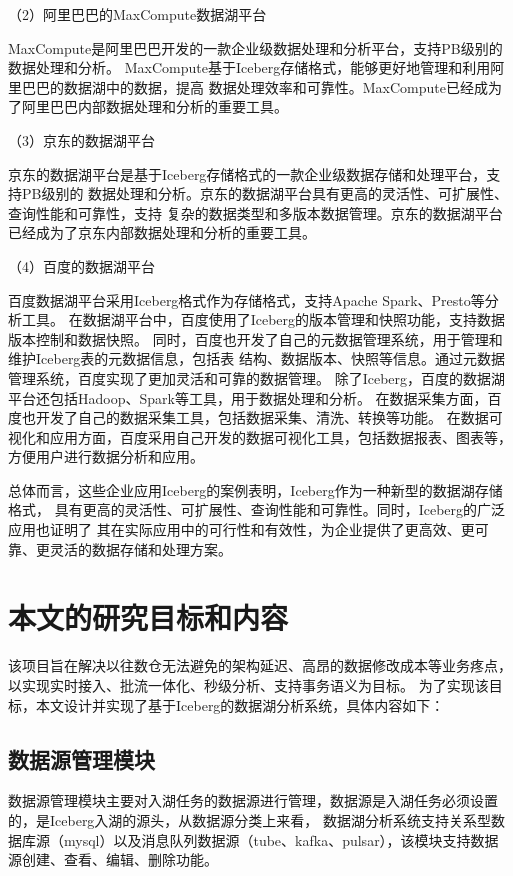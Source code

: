 （2）阿里巴巴的MaxCompute数据湖平台

MaxCompute是阿里巴巴开发的一款企业级数据处理和分析平台，支持PB级别的数据处理和分析。
MaxCompute基于Iceberg存储格式，能够更好地管理和利用阿里巴巴的数据湖中的数据，提高
数据处理效率和可靠性。MaxCompute已经成为了阿里巴巴内部数据处理和分析的重要工具。

（3）京东的数据湖平台

京东的数据湖平台是基于Iceberg存储格式的一款企业级数据存储和处理平台，支持PB级别的
数据处理和分析。京东的数据湖平台具有更高的灵活性、可扩展性、查询性能和可靠性，支持
复杂的数据类型和多版本数据管理。京东的数据湖平台已经成为了京东内部数据处理和分析的重要工具。

（4）百度的数据湖平台

百度数据湖平台采用Iceberg格式作为存储格式，支持Apache Spark、Presto等分析工具。
在数据湖平台中，百度使用了Iceberg的版本管理和快照功能，支持数据版本控制和数据快照。
同时，百度也开发了自己的元数据管理系统，用于管理和维护Iceberg表的元数据信息，包括表
结构、数据版本、快照等信息。通过元数据管理系统，百度实现了更加灵活和可靠的数据管理。
除了Iceberg，百度的数据湖平台还包括Hadoop、Spark等工具，用于数据处理和分析。
在数据采集方面，百度也开发了自己的数据采集工具，包括数据采集、清洗、转换等功能。
在数据可视化和应用方面，百度采用自己开发的数据可视化工具，包括数据报表、图表等，方便用户进行数据分析和应用。

总体而言，这些企业应用Iceberg的案例表明，Iceberg作为一种新型的数据湖存储格式，
具有更高的灵活性、可扩展性、查询性能和可靠性。同时，Iceberg的广泛应用也证明了
其在实际应用中的可行性和有效性，为企业提供了更高效、更可靠、更灵活的数据存储和处理方案。

\section{本文的研究目标和内容}

该项目旨在解决以往数仓无法避免的架构延迟、高昂的数据修改成本等业务疼点，以实现实时接入、批流一体化、秒级分析、支持事务语义为目标。
为了实现该目标，本文设计并实现了基于Iceberg的数据湖分析系统，具体内容如下：

\subsection{数据源管理模块}

数据源管理模块主要对入湖任务的数据源进行管理，数据源是入湖任务必须设置的，是Iceberg入湖的源头，从数据源分类上来看，
数据湖分析系统支持关系型数据库源（mysql）以及消息队列数据源（tube、kafka、pulsar），该模块支持数据源创建、查看、编辑、删除功能。

